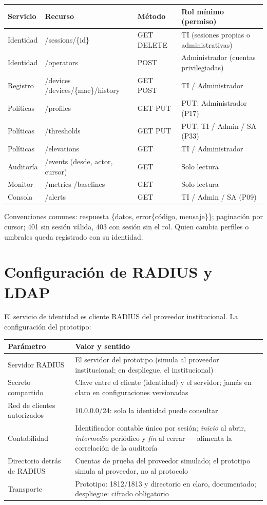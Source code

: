 \documentclass[11pt,a4paper]{article}
\begin{document}
\begin{longtable}{p{3.0cm}p{4.6cm}p{1.8cm}p{4.6cm}}
\toprule
\textbf{Servicio} & \textbf{Recurso} & \textbf{Método} & \textbf{Rol mínimo (permiso)}\\
\midrule
Identidad & /sessions/\{id\} & GET \textperiodcentered{} DELETE & TI (sesiones propias o administrativas)\\
Identidad & /operators & POST & Administrador (cuentas privilegiadas)\\
Registro & /devices \textperiodcentered{} /devices/\{mac\}/history & GET \textperiodcentered{} POST & TI / Administrador\\
Políticas & /profiles & GET \textperiodcentered{} PUT & PUT: Administrador (P17)\\
Políticas & /thresholds & GET \textperiodcentered{} PUT & PUT: TI / Admin / SA (P33)\\
Políticas & /elevations & GET & TI / Administrador\\
Auditoría & /events (desde, actor, cursor) & GET & Solo lectura\\
Monitor & /metrics \textperiodcentered{} /baselines & GET & Solo lectura\\
Consola & /alerts & GET & TI / Admin / SA (P09)\\
\bottomrule
\end{longtable}

Convenciones comunes: respuesta \{datos, error\{código, mensaje\}\}; paginación por cursor; 401 sin sesión válida, 403 con sesión sin el rol. Quien cambia perfiles o umbrales queda registrado con su identidad.

\section{Configuración de RADIUS y LDAP}

El servicio de identidad es cliente RADIUS del proveedor institucional. La configuración del prototipo:

\begin{longtable}{p{5.0cm}p{9.0cm}}
\toprule
\textbf{Parámetro} & \textbf{Valor y sentido}\\
\midrule
Servidor RADIUS & El servidor del prototipo (simula al proveedor institucional; en despliegue, el institucional)\\
Secreto compartido & Clave entre el cliente (identidad) y el servidor; jamás en claro en configuraciones versionadas\\
Red de clientes autorizados & 10.0.0.0/24: solo la identidad puede consultar\\
Contabilidad & Identificador contable único por sesión; \emph{inicio} al abrir, \emph{intermedio} periódico y \emph{fin} al cerrar --- alimenta la correlación de la auditoría\\
Directorio detrás de RADIUS & Cuentas de prueba del proveedor simulado; el prototipo simula al proveedor, no al protocolo\\
Transporte & Prototipo: 1812/1813 y directorio en claro, documentado; despliegue: cifrado obligatorio\\
\bottomrule
\end{longtable}
\end{document}
